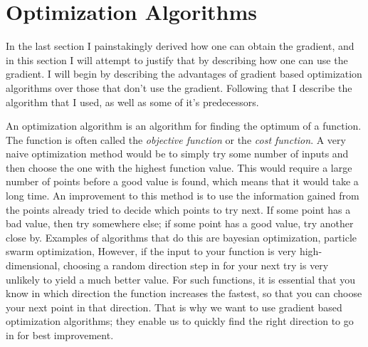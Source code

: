 
\section{Optimization Algorithms}

In the last section I painstakingly derived how one can obtain the gradient,
and in this section I will attempt to justify that by describing how one can use
the gradient.
I will begin by describing the advantages of gradient based optimization
algorithms over those that don't use the gradient.
Following that I describe the algorithm that I used, as well as some of it's
predecessors.

An optimization algorithm is an algorithm for finding the optimum of a function.
The function is often called the \emph{objective function} or the \emph{cost
function}.
A very naive optimization method would be to simply try some number of inputs
and then choose the one with the highest function value.
This would require a large number of points before a good value is found,
which means that it would take a long time.
An improvement to this method is to use the information gained from the points
already tried to decide which points to try next.
If some point has a bad value, then try somewhere else; if some point has a good
value, try another close by.
Examples of algorithms that do this are bayesian optimization, particle swarm
optimization, 
However, if the input to your function is very high-dimensional,
choosing a random direction step in for your next try is very unlikely
to yield a much better value.
For such functions, it is essential that you know in which direction the
function increases the fastest, so that you can choose your next point in that
direction. That is why we want to use gradient based optimization algorithms;
they enable us to quickly find the right direction to go in for best
improvement.


